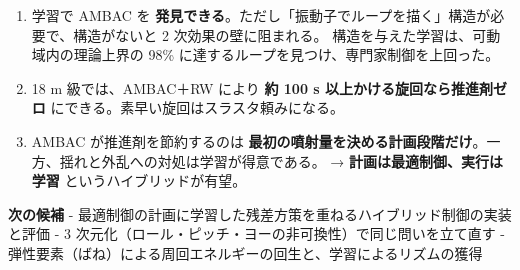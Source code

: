 \begin{enumerate}
\def\labelenumi{\arabic{enumi}.}
\tightlist
\item
  学習で AMBAC を \textbf{発見できる}。ただし「振動子でループを描く」構造が必要で、構造がないと 2 次効果の壁に阻まれる。 構造を与えた学習は、可動域内の理論上界の 98\% に達するループを見つけ、専門家制御を上回った。
\item
  18 m 級では、AMBAC＋RW により \textbf{約 100 s 以上かける旋回なら推進剤ゼロ} にできる。素早い旋回はスラスタ頼みになる。
\item
  AMBAC が推進剤を節約するのは \textbf{最初の噴射量を決める計画段階だけ}。一方、揺れと外乱への対処は学習が得意である。 → \textbf{計画は最適制御、実行は学習} というハイブリッドが有望。
\end{enumerate}

\textbf{次の候補} - 最適制御の計画に学習した残差方策を重ねるハイブリッド制御の実装と評価 - 3 次元化（ロール・ピッチ・ヨーの非可換性）で同じ問いを立て直す - 弾性要素（ばね）による周回エネルギーの回生と、学習によるリズムの獲得
